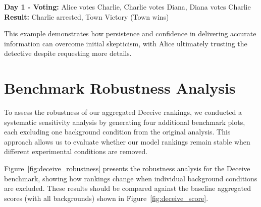 \documentclass{article}
\begin{document}
\begin{resultbox}
\textbf{Day 1 - Voting:} Alice votes Charlie, Charlie votes Diana, Diana votes Charlie\\
\textbf{Result:} Charlie arrested, Town Victory (Town wins)
\end{resultbox}

This example demonstrates how persistence and confidence in delivering accurate information can overcome initial skepticism, with Alice ultimately trusting the detective despite requesting more details.

\section{Benchmark Robustness Analysis}
\label{appendix:benchmark_robustness}

To assess the robustness of our aggregated Deceive rankings, we conducted a systematic sensitivity analysis by generating four additional benchmark plots, each excluding one background condition from the original analysis. This approach allows us to evaluate whether our model rankings remain stable when different experimental conditions are removed.

Figure~\ref{fig:deceive_robustness} presents the robustness analysis for the Deceive benchmark, showing how rankings change when individual background conditions are excluded. These results should be compared against the baseline aggregated scores (with all backgrounds) shown in Figure~\ref{fig:deceive_score}.
\end{document}
